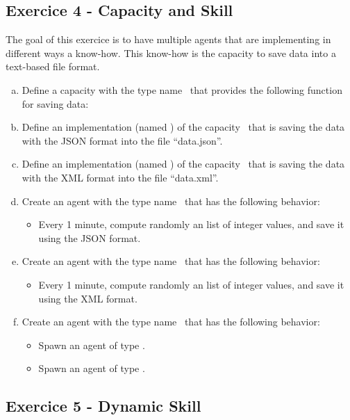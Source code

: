 \documentclass[english,nodocumentinfo,nopubpage]{utbmciadreport}
\begin{document}
\subsection{Exercice 4 - Capacity and Skill}

The goal of this exercice is to have multiple agents that are implementing in different ways a know-how. This know-how is the capacity to save data into a text-based file format.

\begin{enumerate}[a)]
\item Define a capacity with the type name \ that provides the following function for saving data: \\
\item Define an implementation (named ) of the capacity \ that is saving the data with the JSON format into the file ``data.json''.
\item Define an implementation (named ) of the capacity \ that is saving the data with the XML format into the file ``data.xml''.
\item Create an agent with the type name \ that has the following behavior:
	\begin{itemize}
	\item Every 1 minute, compute randomly an list of integer values, and save it using the JSON format.
	\end{itemize}
\item Create an agent with the type name \ that has the following behavior:
	\begin{itemize}
	\item Every 1 minute, compute randomly an list of integer values, and save it using the XML format.
	\end{itemize}
\item Create an agent with the type name \ that has the following behavior:
	\begin{itemize}
	\item Spawn an agent of type .
	\item Spawn an agent of type .
	\end{itemize}
\end{enumerate}

\subsection{Exercice 5 - Dynamic Skill}
\end{document}
